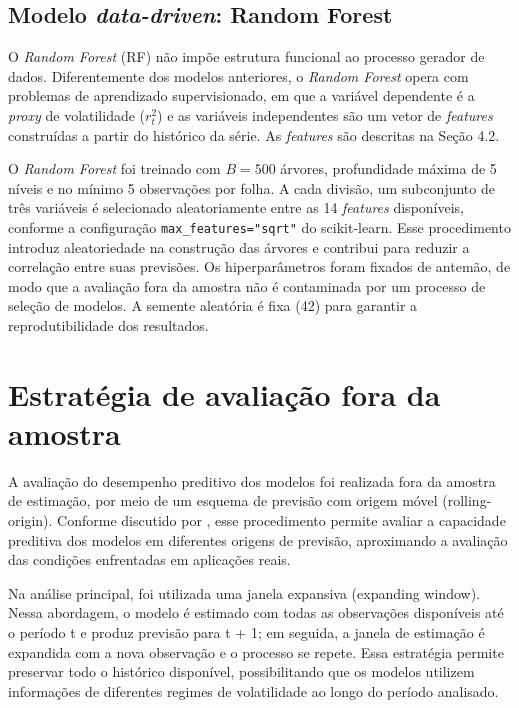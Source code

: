 \subsection{Modelo \textit{data-driven}: Random Forest}
O \textit{Random Forest} (RF) não impõe estrutura funcional ao processo gerador de dados. Diferentemente dos modelos anteriores,
o \textit{Random Forest} opera com problemas de aprendizado supervisionado, em que a variável dependente é a \textit{proxy} de volatilidade ($r_t^2$) e as variáveis 
independentes são um vetor de \textit{features} construídas a partir do histórico da série. As \textit{features} são descritas na Seção 4.2.

O \textit{Random Forest} foi treinado com $B = 500$ árvores, profundidade máxima de 5 níveis e no mínimo 5 observações por folha. A cada divisão, um subconjunto de três variáveis é selecionado 
aleatoriamente entre as 14 \textit{features} disponíveis, conforme a configuração \texttt{max\_features="sqrt"} do scikit-learn. Esse procedimento introduz aleatoriedade na construção das árvores e contribui 
para reduzir a correlação entre suas previsões. Os hiperparâmetros foram fixados de antemão, de modo que a avaliação fora da amostra não é contaminada por 
um processo de seleção de modelos. A semente aleatória é fixa (42) para garantir a reprodutibilidade dos resultados.

\section{Estratégia de avaliação fora da amostra}

A avaliação do desempenho preditivo dos modelos foi realizada fora da amostra de estimação, por meio de um esquema de previsão com origem móvel (rolling-origin). Conforme discutido por \textcite{tashman2000out}, 
esse procedimento permite avaliar a capacidade preditiva dos modelos em diferentes origens de previsão, aproximando a avaliação das condições enfrentadas em aplicações reais.

Na análise principal, foi utilizada uma janela expansiva (expanding window). Nessa abordagem, o modelo é 
estimado com todas as observações disponíveis até o período t e produz previsão para t + 1; em seguida, a janela de estimação é expandida com a nova observação e o processo se repete. 
Essa estratégia permite preservar todo o histórico disponível, possibilitando que os modelos utilizem informações de diferentes regimes de volatilidade ao longo do período analisado.

